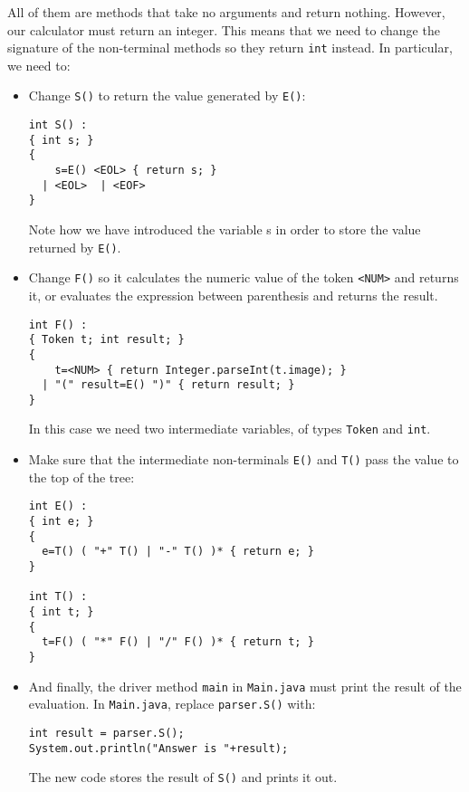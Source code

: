 \documentclass{article}
\begin{document}
All of them are methods that take no arguments and return nothing. However, our calculator must return an integer. This means that we need to change the signature of the non-terminal methods so they return {\tt int} instead. In particular, we need to:

\begin{itemize}
\item Change {\tt S()} to return the value generated by {\tt E()}:

\begin{verbatim}
int S() :
{ int s; }
{
    s=E() <EOL> { return s; }
  | <EOL>  | <EOF>
}
\end{verbatim}

Note how we have introduced the variable s in order to store the value returned by \verb+E()+.

\item Change {\tt F()} so it calculates the numeric value of the token \verb+<NUM>+ and returns it, or evaluates the expression between parenthesis and returns the result.

\begin{verbatim}
int F() :
{ Token t; int result; }
{
    t=<NUM> { return Integer.parseInt(t.image); }
  | "(" result=E() ")" { return result; }
}
\end{verbatim}

In this case we need two intermediate variables, of types {\tt Token} and {\tt int}.

\item Make sure that the intermediate non-terminals {\tt E()} and {\tt T()} pass the value to the top of the tree:

\begin{verbatim}
int E() :
{ int e; }
{
  e=T() ( "+" T() | "-" T() )* { return e; }
}

int T() :
{ int t; }
{
  t=F() ( "*" F() | "/" F() )* { return t; }
}
\end{verbatim}

\item And finally, the driver method {\tt main} in {\tt Main.java} must print the result of the evaluation. In {\tt Main.java}, replace {\tt parser.S()} with:
\begin{verbatim}
int result = parser.S();
System.out.println("Answer is "+result);
\end{verbatim}
The new code stores the result of {\tt S()} and prints it out.

\end{itemize}
\end{document}
